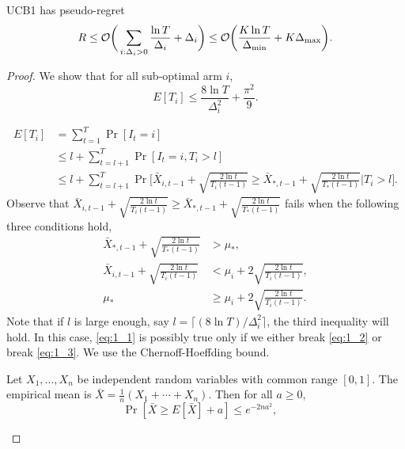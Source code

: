 \begin{thm}
    UCB1 has pseudo-regret
    \begin{equation}
        R \le \mathcal{O}\bigg(\sum_{i:\Delta_i>0} \frac{\ln T}{\Delta_i}+\Delta_i\bigg)
            \le \mathcal{O}\bigg(\frac{K\ln T}{\Delta_\text{min}}+K\Delta_\text{max}\bigg).
    \end{equation}
\end{thm}
\begin{proof}
    We show that for all sub-optimal arm $i$,
    \begin{equation}
        E[T_i] \le \frac{8\ln T}{\Delta_i^2} + \frac{\pi^2}{9}.
    \end{equation}

    \begin{align}
        E[T_i]
            &= \sum_{t=1}^T \Pr[I_t=i] \\
            &\le l + \sum_{t=l+1}^T \Pr[I_t=i, T_i>l] \\
            &\le l + \sum_{t=l+1}^T \Pr\bigg[\bar X_{i,t-1} + \sqrt{\frac{2\ln t}{T_i(t-1)}}\ge \bar X_{*,t-1}+\sqrt{\frac{2\ln t}{T_{*}(t-1)}}\bigg|T_i>l\bigg]. \label{eq:1_1}
    \end{align}
    Observe that $\bar X_{i,t-1} + \sqrt{\frac{2\ln t}{T_i(t-1)}}\ge \bar X_{*,t-1}+\sqrt{\frac{2\ln t}{T_{*}(t-1)}}$
    fails when the following three conditions hold,
    \begin{align}
        \bar X_{*,t-1} + \sqrt{\frac{2\ln t}{T_{*}(t-1)}} &> \mu_*,  \\
        \bar X_{i,t-1} + \sqrt{\frac{2\ln t}{T_{i}(t-1)}} &< \mu_i + 2\sqrt{\frac{2\ln t}{T_{i}(t-1)}}, \label{eq:1_2} \\
        \mu_* &\ge \mu_i + 2\sqrt{\frac{2\ln t}{T_{i}(t-1)}}. \label{eq:1_3}
    \end{align}
    Note that if $l$ is large enough,
    say $l=\lceil (8\ln T)/\Delta_i^2\rceil$,
    the third inequality will hold.
    In this case,
    \eqref{eq:1_1} is possibly true only if we either break \eqref{eq:1_2} or break \eqref{eq:1_3}.
    We use the Chernoff-Hoeffding bound.
    \begin{framed}
        \begin{fact}
            Let $X_1, \dots, X_n$ be independent random variables with common range $[0,1]$.
            The empirical mean is $\bar X=\frac{1}{n}(X_1+\cdots+ X_n)$.
            Then for all $a\ge0$,
            \begin{equation}
                \Pr[\bar X\ge E[\bar X] + a] \le e^{-2na^2}, \quad

\end{equation}
\end{fact}
\end{framed}
\end{proof}

